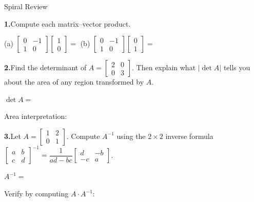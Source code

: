 \documentclass[10pt]{article}
\begin{document}
\namedateperiod

\vspace{0.12in}

\begin{notesbox}{Spiral Review}
\small

\textbf{1.}\quad Compute each matrix--vector product.

\vspace{0.06in}
\hspace{1em}
(a)\quad
$\begin{bmatrix}0 & -1 \\ 1 & 0\end{bmatrix}
\begin{bmatrix}1 \\ 0\end{bmatrix}
= $ \blank{3cm}
\qquad\qquad
(b)\quad
$\begin{bmatrix}0 & -1 \\ 1 & 0\end{bmatrix}
\begin{bmatrix}0 \\ 1\end{bmatrix}
= $ \blank{3cm}

\vspace{0.2in}

\textbf{2.}\quad Find the determinant of $A = \begin{bmatrix}2 & 0 \\ 0 & 3\end{bmatrix}$.
Then explain what $|\det A|$ tells you about the area of any region transformed by $A$.

\vspace{0.06in}
\hspace{1em} $\det A = $ \blank{2.5cm}

\vspace{0.06in}
\hspace{1em} Area interpretation: \blank{9cm}

\vspace{0.2in}

\textbf{3.}\quad Let $A = \begin{bmatrix}1 & 2 \\ 0 & 1\end{bmatrix}$.
Compute $A^{-1}$ using the $2\times2$ inverse formula
$\begin{bmatrix}a&b\\c&d\end{bmatrix}^{-1}=\dfrac{1}{ad-bc}\begin{bmatrix}d&-b\\-c&a\end{bmatrix}$.

\vspace{0.1in}
\hspace{1em} $A^{-1} = $ \blank{4cm}

\vspace{0.06in}
\hspace{1em} Verify by computing $A \cdot A^{-1}$: \blank{6cm}

\end{notesbox}
\end{document}
